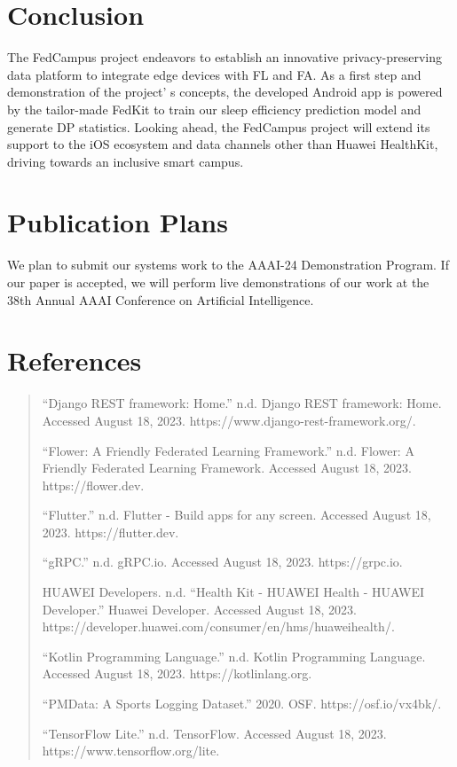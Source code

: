 \documentclass{article}
\begin{document}
\begin{multicols}{2}
\section{Conclusion}

The FedCampus project endeavors to establish an innovative
privacy-preserving data platform to integrate edge devices with FL and
FA. As a first step and demonstration of the project' s
concepts, the developed Android app is powered by the tailor-made FedKit
to train our sleep efficiency prediction model and generate DP
statistics. Looking ahead, the FedCampus project will extend its support
to the iOS ecosystem and data channels other than Huawei HealthKit,
driving towards an inclusive smart campus.

\section{Publication Plans}

We plan to submit our systems work to the AAAI-24 Demonstration Program.
If our paper is accepted, we will perform live demonstrations of our
work at the 38th Annual AAAI Conference on Artificial Intelligence.
\end{multicols}

\section{References}
\begin{quote}

``Django REST framework: Home.'' n.d. Django REST framework: Home.
Accessed August 18, 2023. https://www.django-rest-framework.org/.

``Flower: A Friendly Federated Learning Framework.'' n.d. Flower: A
Friendly Federated Learning Framework. Accessed August 18, 2023.
https://flower.dev.

``Flutter.'' n.d. Flutter - Build apps for any screen. Accessed August
18, 2023. https://flutter.dev.

``gRPC.'' n.d. gRPC.io. Accessed August 18, 2023. https://grpc.io.

HUAWEI Developers. n.d. ``Health Kit - HUAWEI Health - HUAWEI
Developer.'' Huawei Developer. Accessed August 18, 2023.
https://developer.huawei.com/consumer/en/hms/huaweihealth/.

``Kotlin Programming Language.'' n.d. Kotlin Programming Language.
Accessed August 18, 2023. https://kotlinlang.org.

``PMData: A Sports Logging Dataset.'' 2020. OSF. https://osf.io/vx4bk/.

``TensorFlow Lite.'' n.d. TensorFlow. Accessed August 18, 2023.
https://www.tensorflow.org/lite.
\end{quote}
\end{document}
